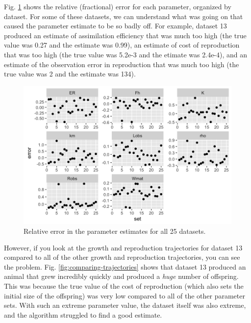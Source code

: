 \documentclass[12pt,reqno,final,pdftex]{amsart}\usepackage[]{graphicx}\usepackage[]{color}
\newenvironment{knitrout}{}{} %
\theoremstyle{plain}
\numberwithin{equation}{part}
\begin{document}
Fig. \ref{fig:rel-error-25-2} shows the relative (fractional) error for each parameter, organized by dataset.
For some of these datasets, we can understand what was going on that caused the parameter estimate to be so badly off.
For example, dataset 13 produced an estimate of assimilation efficiency that was much too high (the true value was 0.27 and the estimate was 0.99), an estimate of cost of reproduction that was too high (the true value was 5.2e-3 and the etimate was 2.4e-4), and an estimate of the observation error in reproduction that was much too high (the true value was 2 and the estimate was 134).

\begin{knitrout}\scriptsize
{}\color{fgcolor}\begin{figure}

\includegraphics[width=\linewidth]{figure/rel-error-25-2-1} \hfill{}

\caption[Relative error in the parameter estimates for all 25 datasets]{Relative error in the parameter estimates for all 25 datasets.}\label{fig:rel-error-25-2}
\end{figure}


\end{knitrout}

\clearpage

However, if you look at the growth and reproduction trajectories for dataset 13 compared to all of the other growth and reproduction trajectories, you can see the problem.
Fig. \ref{fig:comparing-trajectories} shows that dataset 13 produced an animal that grew incredibly quickly and produced a \emph{huge} number of offspring.
This was because the true value of the cost of reproduction (which also sets the initial size of the offspring) was very low compared to all of the other parameter sets.
With such an extreme parameter value, the dataset itself was also extreme, and the algorithm struggled to find a good estimate.
\end{document}
